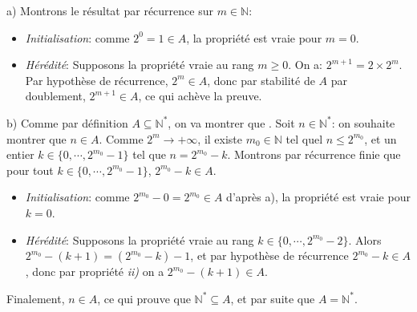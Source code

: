 a) Montrons le résultat par récurrence sur $m\in\mathbb{N}$:
\begin{itemize}
  \item \textit{Initialisation}: comme $2^0=1\in A$, la propriété est vraie pour $m=0$.
  \item \textit{Hérédité}: Supposons la propriété vraie au rang $m\geq 0$. On a: $2^{m+1}=2\times 2^m$. Par hypothèse de récurrence, $2^m \in A$, donc par stabilité de $A$ par doublement, $2^{m+1}\in A$, ce qui achève la preuve. \\ 
\end{itemize}
b) Comme par définition $A\subseteq \mathbb{N}^*$, on va montrer que . Soit $n\in\mathbb{N}^*$: on souhaite montrer que $n\in A$. Comme $2^m\to +\infty$, il existe $m_0\in\mathbb{N}$ tel quel $n\leq 2^{m_0}$, et un entier $k\in\{ 0,\cdots, 2^{m_0}-1 \}$ tel que $n=2^{m_0}-k$. Montrons par récurrence finie que pour tout $k\in\{ 0,\cdots, 2^{m_0}-1 \}$,  $2^{m_0}-k\in A$.
\begin{itemize}
  \item \textit{Initialisation}: comme $2^{m_0}-0=2^{m_0}\in A$ d’après a), la propriété est vraie pour $k=0$.
  \item \textit{Hérédité}: Supposons la propriété vraie au rang $k\in\{ 0,\cdots, 2^{m_0}-2 \}$. Alors $2^{m_0}-(k+1)=\left(2^{m_0}-k\right)-1$, et par hypothèse de récurrence $2^{m_0}-k\in A$, donc par propriété \textit{ii)} on a $2^{m_0}-(k+1)\in A$.
\end{itemize}
Finalement, $n\in A$, ce qui prouve que $\mathbb{N}^* \subseteq A$, et par suite que $A=\mathbb{N}^*$.
